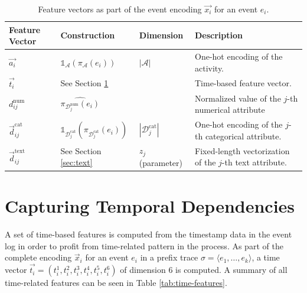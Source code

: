 \begin{table}[!tbp]
	\renewcommand{\arraystretch}{1.2}
	\setlength\tabcolsep{5pt}
	\begin{tabularx}{\textwidth}{
			>{\hsize=0.6\hsize}X
			>{\hsize=0.8\hsize}X
			>{\hsize=0.6\hsize}X
			>{\hsize=2.0\hsize}X
		}
		\toprule
		\textbf{Feature} \newline \textbf{Vector} & \textbf{Construction} &\textbf{Dimension} &  \textbf{Description} \\
		\midrule
		$\vec{a_i}$ &$\mathds{1}_\mathcal{A}(\pi_\mathcal{A}(e_i))$& $|\mathcal{A}|$& One-hot encoding of the activity. \\
		$\vec{t_i}$ & See Section \ref{sec:time} &6 & Time-based feature vector.\\
		$d_{ij}^\mathrm{num}$ &  $\widehat{\pi_{\mathcal{D}_j^\mathrm{num}}(e_i)} $ &1 & Normalized value of the $j$-th numerical attribute\\
		$\vec{d}_{ij}^\mathrm{cat}$ & $\mathds{1}_{\mathcal{D}_j^{\mathrm{cat}}}(\pi_{\mathcal{D}_j^\mathrm{cat}}(e_i))$&$|\mathcal{D}_j^\mathrm{cat}|$ & One-hot encoding of the $j$-th categorical attribute.\\
		$\vec{d}_{ij}^\mathrm{text}$ & See Section \ref{sec:text} & $z_j$ \newline (parameter) & Fixed-length vectorization of the $j$-th text attribute.\\
		\bottomrule
	\end{tabularx}
	\caption[Feature vectors as part of the event encoding]{Feature vectors as part of the event encoding $\vec{x_i}$ for an event $e_i$.}
	\label{tab:features}
\end{table}

\section{Capturing Temporal Dependencies}\label{sec:time}

A set of time-based features is computed from the timestamp data in the event log in order to profit from time-related pattern in the process.
As part of the complete encoding $\vec{x}_i$ for an event $e_i$ in a prefix trace $\sigma = \langle e_1, \dots, e_k \rangle$, a time vector $\vec{t_i} = (t_i^1, t_i^2,t_i^3,t_i^4,t_i^5,t_i^6)$ of dimension 6 is computed.
A summary of all time-related features can be seen in Table \ref{tab:time-features}.

